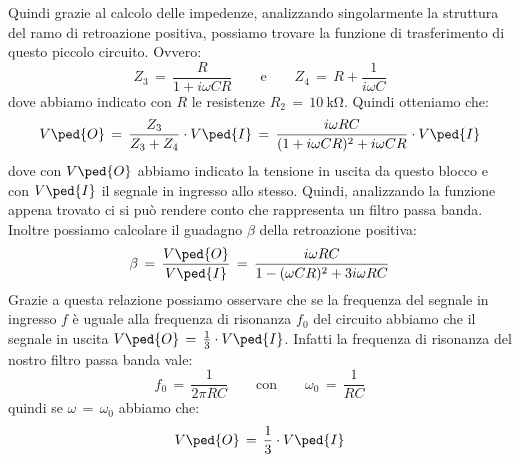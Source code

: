 Quindi grazie al calcolo delle impedenze, analizzando singolarmente la struttura del ramo di retroazione positiva, possiamo trovare la funzione di trasferimento di questo piccolo circuito. Ovvero:
\begin{equation}
	Z_3\,=\,\frac{R}{1 + i \omega C R} \qquad \text{e} \qquad Z_4\,=\,R + \frac{1}{i \omega C}
\end{equation}
dove abbiamo indicato con $R$ le resistenze $R_2\,=\,\SI{10}{\kilo\ohm}$. Quindi otteniamo che:
\begin{equation}
	V\ped{O}\,=\,\frac{Z_3}{Z_3 + Z_4} \cdot V\ped{I}\,=\,\frac{i \omega R C}{(1 + i \omega C R)^2 + i \omega C R} \cdot V\ped{I}
\end{equation}
dove con $V\ped{O}$ abbiamo indicato la tensione in uscita da questo blocco e con $V\ped{I}$ il segnale in ingresso allo stesso.
Quindi, analizzando la funzione appena trovato ci si può rendere conto che rappresenta un filtro passa banda. Inoltre possiamo calcolare il guadagno $\beta$ della retroazione positiva:
\begin{equation}
	\beta\,=\,\frac{V\ped{O}}{V\ped{I}}\,=\,\frac{i \omega R C}{1 - (\omega C R)^2 + 3 i \omega R C}
\end{equation}
Grazie a questa relazione possiamo osservare che se la frequenza del segnale in ingresso $f$ è uguale alla frequenza di risonanza $f_0$ del circuito abbiamo che il segnale in uscita $V\ped{O}\,=\,\frac{1}{3} \cdot V\ped{I}$. Infatti la frequenza di risonanza del nostro filtro passa banda vale:
\begin{equation}
	f_0\,=\, \frac{1}{2 \pi R C} \qquad \text{con} \qquad \omega_0\,=\,\frac{1}{RC}
\end{equation}
quindi se $\omega \,=\, \omega_0$ abbiamo che:
\begin{equation}
	V\ped{O}\,=\,\frac{1}{3} \cdot V\ped{I}
\end{equation}



